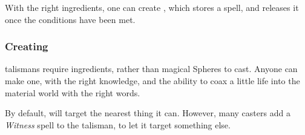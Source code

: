\begin{multicols}{2}

\noindent
With the right \glspl{ingredient}, one can create , which stores a spell, and releases it once the conditions have been met.

\subsubsection{Creating }

\Glspl{talisman} require \glspl{ingredient}, rather than magical Spheres to cast.
Anyone can make one, with the right knowledge, and the ability to coax a little life into the material world with the right words.

By default,  will target the nearest thing it can.
However, many casters add a \textit{Witness} spell to the \gls{talisman}, to let it target something else.


\end{multicols}
